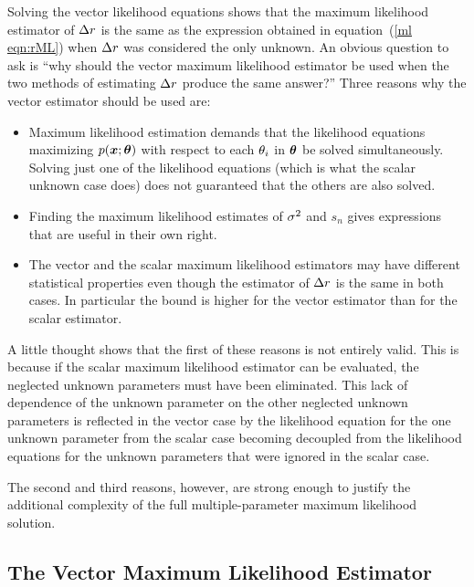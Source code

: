 Solving the vector likelihood equations shows that the maximum likelihood
estimator of ${\Delta r}$ is the same as the expression obtained in 
equation~(\ref{ml eqn:rML}) when ${\Delta r}$ was considered the only unknown.  
An obvious question to ask is ``why should the vector maximum likelihood
estimator be used when the two methods of estimating ${\Delta r}$ produce the 
same answer?''  Three reasons why the vector estimator should be used are:
\begin{itemize}
\item Maximum likelihood estimation demands that the likelihood
equations maximizing $p(\bm{x};\bm{\theta})$ with respect to each $\theta_{i}$ in $\bm{\theta}$
be solved simultaneously.  Solving just one of the likelihood equations 
(which is what the scalar unknown case does) does not guaranteed that the 
others are also solved.  
\item Finding the maximum likelihood estimates of ${\sigma^2}$ and $s_n$ gives
expressions that are useful in their own right.
\item The vector and the scalar maximum likelihood estimators may have
different statistical properties even though the estimator of ${\Delta r}$ is the
same in both cases.  In particular the \CR bound is higher for the vector
estimator than for the scalar estimator.
\end{itemize}

A little thought shows that the first of these reasons is not entirely valid.
This is because if the scalar maximum likelihood estimator can be evaluated,
the neglected unknown parameters must have been eliminated.  This lack of
dependence of the unknown parameter on the other neglected unknown 
parameters is reflected in the vector case by the likelihood equation for
the one unknown parameter from the scalar case becoming decoupled from the
likelihood equations for the unknown parameters that were ignored in the
scalar case.

The second and third reasons, however, are strong enough to justify the
additional complexity of the full multiple-parameter maximum likelihood
solution.

\subsection{The Vector Maximum Likelihood Estimator}

